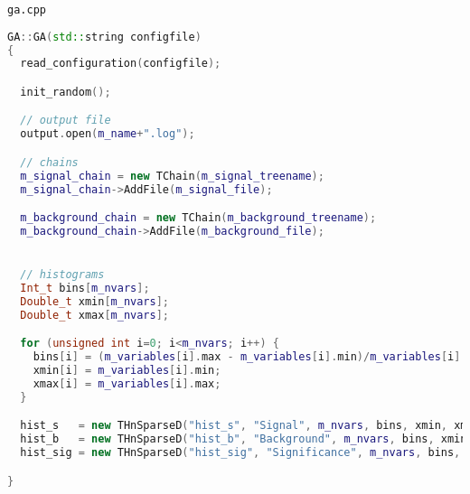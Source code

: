 \documentclass[center,10pt,cm]{beamer}
\begin{document}
\begin{frame}[fragile]{\texttt{ga.cpp}}

  \begin{lstlisting}[language=c++]
    GA::GA(std::string configfile)
{
  read_configuration(configfile);

  init_random();

  // output file
  output.open(m_name+".log");

  // chains
  m_signal_chain = new TChain(m_signal_treename);
  m_signal_chain->AddFile(m_signal_file);

  m_background_chain = new TChain(m_background_treename);
  m_background_chain->AddFile(m_background_file);


  // histograms
  Int_t bins[m_nvars];
  Double_t xmin[m_nvars];
  Double_t xmax[m_nvars];

  for (unsigned int i=0; i<m_nvars; i++) {
    bins[i] = (m_variables[i].max - m_variables[i].min)/m_variables[i].step;
    xmin[i] = m_variables[i].min;
    xmax[i] = m_variables[i].max;
  }

  hist_s   = new THnSparseD("hist_s", "Signal", m_nvars, bins, xmin, xmax);
  hist_b   = new THnSparseD("hist_b", "Background", m_nvars, bins, xmin, xmax);
  hist_sig = new THnSparseD("hist_sig", "Significance", m_nvars, bins, xmin, xmax);

}
\end{lstlisting}

\end{frame}
\end{document}
